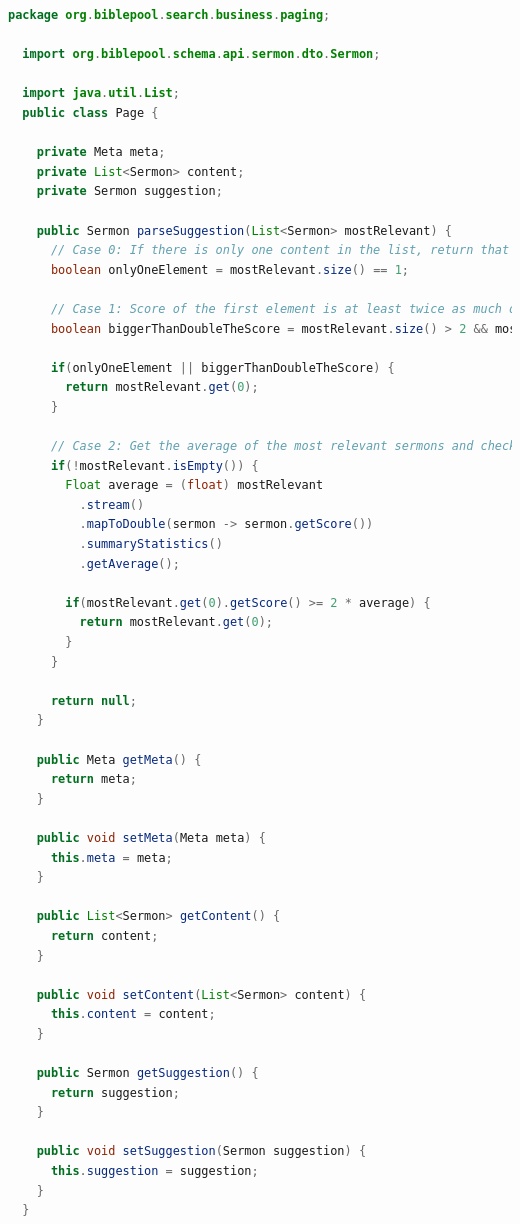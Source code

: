 \clearpage

\begin{lstlisting}[language=Java, label={code:SolrResponse}, title={Vorschlag in der zurückgegebenen Antwort \cite{solr-search2022}}]
  package org.biblepool.search.business.paging;

  import org.biblepool.schema.api.sermon.dto.Sermon;

  import java.util.List;
  public class Page {

    private Meta meta;
    private List<Sermon> content;
    private Sermon suggestion;

    public Sermon parseSuggestion(List<Sermon> mostRelevant) {
      // Case 0: If there is only one content in the list, return that as suggestion
      boolean onlyOneElement = mostRelevant.size() == 1;

      // Case 1: Score of the first element is at least twice as much of the second score
      boolean biggerThanDoubleTheScore = mostRelevant.size() > 2 && mostRelevant.get(0).getScore() >= 2 * mostRelevant.get(1).getScore();

      if(onlyOneElement || biggerThanDoubleTheScore) {
        return mostRelevant.get(0);
      }

      // Case 2: Get the average of the most relevant sermons and check if the first has at least twice as much of that
      if(!mostRelevant.isEmpty()) {
        Float average = (float) mostRelevant
          .stream()
          .mapToDouble(sermon -> sermon.getScore())
          .summaryStatistics()
          .getAverage();

        if(mostRelevant.get(0).getScore() >= 2 * average) {
          return mostRelevant.get(0);
        }
      }

      return null;
    }

    public Meta getMeta() {
      return meta;
    }

    public void setMeta(Meta meta) {
      this.meta = meta;
    }

    public List<Sermon> getContent() {
      return content;
    }

    public void setContent(List<Sermon> content) {
      this.content = content;
    }

    public Sermon getSuggestion() {
      return suggestion;
    }

    public void setSuggestion(Sermon suggestion) {
      this.suggestion = suggestion;
    }
  }
\end{lstlisting}


